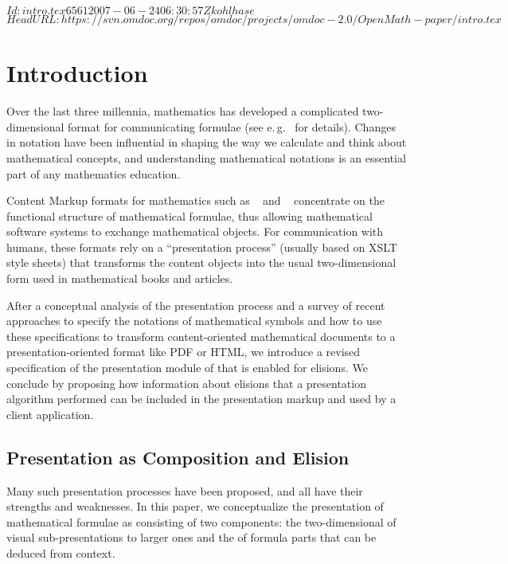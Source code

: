\svnInfo $Id: intro.tex 6561 2007-06-24 06:30:57Z kohlhase $
\svnKeyword $HeadURL: https://svn.omdoc.org/repos/omdoc/projects/omdoc-2.0/OpenMath-paper/intro.tex $
\section{Introduction}\label{sec:intro} 

Over the last three millennia, mathematics has developed a complicated two-dimensional
format for communicating formulae (see e.\,g.~\cite{Cajori:ahmn93,Wolfram:mnpf00} for
details). Changes in notation have been influential in shaping the way we calculate and
think about mathematical concepts, and understanding mathematical notations is an
essential part of any mathematics education.

Content Markup formats for mathematics such as {\openmath}~\cite{BusCapCar:2oms04} and
{\mathml}~\cite{CarIon:MathML03} concentrate on the functional structure of mathematical
formulae, thus allowing mathematical software systems to exchange mathematical
objects. For communication with humans, these formats rely on a ``presentation process''
(usually based on XSLT style sheets) that transforms the content objects into the usual
two-dimensional form used in mathematical books and articles.

After a conceptual analysis of the presentation process and a survey of recent approaches
to specify the notations of mathematical symbols and how to use these specifications to
transform content-oriented mathematical documents to a presentation-oriented format like
PDF or HTML, we introduce a revised specification of the presentation module of {\omdoc}
that is enabled for elisions.  We conclude by proposing how information about elisions
that a presentation algorithm performed can be included in the presentation markup and
used by a client application.

\subsection{Presentation as Composition and Elision}

Many such presentation processes have been proposed, and all have their strengths and
weaknesses. In this paper, we conceptualize the presentation of mathematical formulae as
consisting of two components: the two-dimensional {} of visual
sub-presentations to larger ones and the {} of formula parts that can be
deduced from context.

